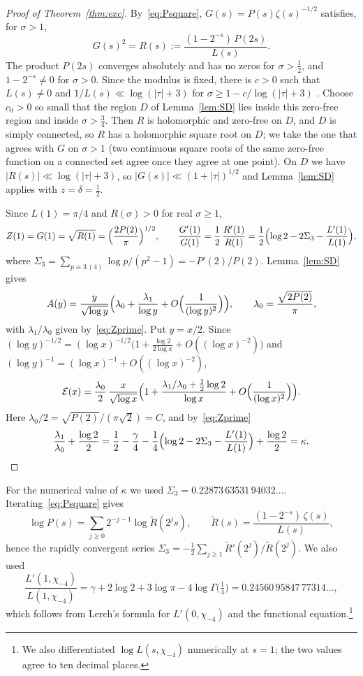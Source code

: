 \documentclass[11pt]{article}
\theoremstyle{definition}
\newcommand{\E}{\mathcal{E}}
\begin{document}
\begin{proof}[Proof of Theorem~\ref{thm:exc}]
By~\eqref{eq:Psquare}, $G(s)=P(s)\zeta(s)^{-1/2}$ satisfies, for $\sigma>1$,
\[
  G(s)^2=R(s):=\frac{(1-2^{-s})\,P(2s)}{L(s)} .
\]
The product $P(2s)$ converges absolutely and has no zeros for $\sigma>\tfrac12$, and $1-2^{-s}\ne0$ for $\sigma>0$. Since the modulus is fixed, there is $c>0$ such that $L(s)\ne0$ and $1/L(s)\ll\log(|\tau|+3)$ for $\sigma\ge1-c/\log(|\tau|+3)$ \cite[Chapter~11]{MV}. Choose $c_0>0$ so small that the region $D$ of Lemma~\ref{lem:SD} lies inside this zero-free region and inside $\sigma>\tfrac34$. Then $R$ is holomorphic and zero-free on $D$, and $D$ is simply connected, so $R$ has a holomorphic square root on $D$; we take the one that agrees with $G$ on $\sigma>1$ (two continuous square roots of the same zero-free function on a connected set agree once they agree at one point). On $D$ we have $|R(s)|\ll\log(|\tau|+3)$, so $|G(s)|\ll(1+|\tau|)^{1/2}$ and Lemma~\ref{lem:SD} applies with $z=\delta=\tfrac12$.

Since $L(1)=\pi/4$ and $R(\sigma)>0$ for real $\sigma\ge1$,
\[
  Z(1)=G(1)=\sqrt{R(1)}=\Bigl(\frac{2P(2)}{\pi}\Bigr)^{1/2},\qquad
  \frac{G'(1)}{G(1)}=\frac12\,\frac{R'(1)}{R(1)}=\frac12\Bigl(\log2-2\Sigma_3-\frac{L'(1)}{L(1)}\Bigr),
\]
where $\Sigma_3=\sum_{p\equiv3\,(4)}\log p/(p^2-1)=-P'(2)/P(2)$. Lemma~\ref{lem:SD} gives
\[
  A(y)=\frac{y}{\sqrt{\log y}}\Bigl(\lambda_0+\frac{\lambda_1}{\log y}+O\Bigl(\frac1{(\log y)^2}\Bigr)\Bigr),\qquad
  \lambda_0=\frac{\sqrt{2P(2)}}{\pi},
\]
with $\lambda_1/\lambda_0$ given by~\eqref{eq:Zprime}. Put $y=x/2$. Since $(\log y)^{-1/2}=(\log x)^{-1/2}\bigl(1+\tfrac{\log2}{2\log x}+O((\log x)^{-2})\bigr)$ and $(\log y)^{-1}=(\log x)^{-1}+O((\log x)^{-2})$,
\[
  \E(x)=\frac{\lambda_0}{2}\,\frac{x}{\sqrt{\log x}}\Bigl(1+\frac{\lambda_1/\lambda_0+\frac12\log 2}{\log x}+O\Bigl(\frac{1}{(\log x)^2}\Bigr)\Bigr).
\]
Here $\lambda_0/2=\sqrt{P(2)}/(\pi\sqrt2)=C$, and by~\eqref{eq:Zprime}
\[
  \frac{\lambda_1}{\lambda_0}+\frac{\log2}{2}=\frac12-\frac{\gamma}{4}-\frac14\Bigl(\log2-2\Sigma_3-\frac{L'(1)}{L(1)}\Bigr)+\frac{\log 2}{2}=\kappa .\qedhere
\]
\end{proof}

For the numerical value of $\kappa$ we used $\Sigma_3=0.22873\,63531\,94032\ldots$. Iterating~\eqref{eq:Psquare} gives
\[
  \log P(s)=\sum_{j\ge0}2^{-j-1}\log\widetilde R(2^js),\qquad \widetilde R(s)=\frac{(1-2^{-s})\,\zeta(s)}{L(s)},
\]
hence the rapidly convergent series $\Sigma_3=-\tfrac12\sum_{j\ge1}\widetilde R'(2^j)/\widetilde R(2^j)$. We also used
\[
  \frac{L'(1,\chi_{-4})}{L(1,\chi_{-4})}=\gamma+2\log2+3\log\pi-4\log\Gamma\bigl(\tfrac14\bigr)=0.24560\,95847\,77314\ldots,
\]
which follows from Lerch's formula for $L'(0,\chi_{-4})$ and the functional equation.\footnote{We also differentiated $\log L(s,\chi_{-4})$ numerically at $s=1$; the two values agree to ten decimal places.}
\end{document}
